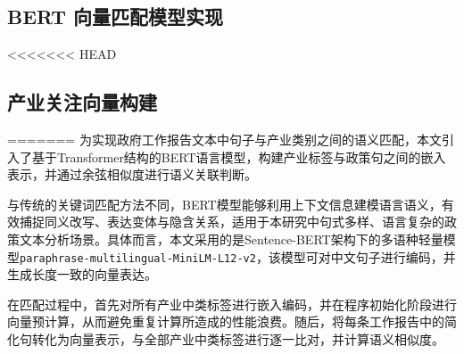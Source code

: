 \documentclass[a4paper,11pt, fontset=fandol]{ctexart}
\begin{document}
\subsection{BERT 向量匹配模型实现}
<<<<<<< HEAD

\subsection{产业关注向量构建}

=======
为实现政府工作报告文本中句子与产业类别之间的语义匹配，本文引入了基于Transformer结构的BERT语言模型，构建产业标签与政策句之间的嵌入表示，并通过余弦相似度进行语义关联判断。

与传统的关键词匹配方法不同，BERT模型能够利用上下文信息建模语言语义，有效捕捉同义改写、表达变体与隐含关系，适用于本研究中句式多样、语言复杂的政策文本分析场景。具体而言，本文采用的是Sentence-BERT架构下的多语种轻量模型\texttt{paraphrase-multilingual-MiniLM-L12-v2}，该模型可对中文句子进行编码，并生成长度一致的向量表达。

在匹配过程中，首先对所有产业中类标签进行嵌入编码，并在程序初始化阶段进行向量预计算，从而避免重复计算所造成的性能浪费。随后，将每条工作报告中的简化句转化为向量表示，与全部产业中类标签进行逐一比对，并计算语义相似度。
\end{document}
